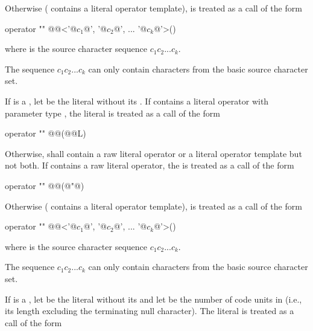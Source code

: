 Otherwise ( contains a literal operator template),  is treated as a call
of the form


\begin{codeblock}
operator "" @@<'@$c_1$@', '@$c_2$@', ... '@$c_k$@'>()
\end{codeblock}

where  is the source character sequence $c_1c_2...c_k$. \begin{note} The sequence
$c_1c_2...c_k$ can only contain characters from the basic source character set.
\end{note}

\pnum
If  is a , let  be the
literal without its . If  contains a literal operator
with parameter type , the literal  is treated as a call of
the form

\begin{codeblock}
operator "" @@(@@L)
\end{codeblock}

Otherwise,  shall contain a raw literal operator or a literal operator
template but not both. If  contains a raw literal operator,
the   is treated as a call of the form

\begin{codeblock}
operator "" @@(@"@)
\end{codeblock}

Otherwise ( contains a literal operator template),  is treated as a call
of the form

\begin{codeblock}
operator "" @@<'@$c_1$@', '@$c_2$@', ... '@$c_k$@'>()
\end{codeblock}

where  is the source character sequence $c_1c_2...c_k$. \begin{note} The sequence
$c_1c_2...c_k$ can only contain characters from the basic source character set.
\end{note}

\pnum
If  is a , let  be the
literal without its  and let  be
the number of
code units in  (i.e., its length excluding the terminating
null character).
 The literal  is treated as a call of the form

